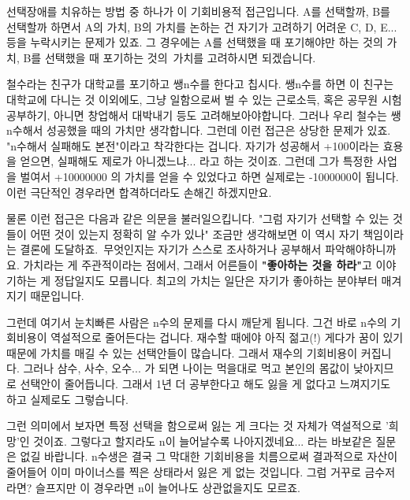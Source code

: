 선택장애를 치유하는 방법 중 하나가 이 기회비용적 접근입니다.
A를 선택할까, B를 선택할까 하면서 A의 가치, B의 가치를 논하는 건 자기가 고려하기 어려운 C, D, E... 등을 누락시키는 문제가 있죠.
그 경우에는 A를 선택했을 때 포기해야만 하는 것의 가치, B를 선택했을 때 포기하는 것의 가치를 고려하시면 되겠습니다.
\vspace{5mm}

철수라는 친구가 대학교를 포기하고 쌩n수를 한다고 칩시다.
쌩n수를 하면 이 친구는 대학교에 다니는 것 이외에도,
그냥 일함으로써 벌 수 있는 근로소득, 혹은 공무원 시험 공부하기, 아니면 창업해서 대박내기 등도 고려해보아야합니다.
그러나 우리 철수는 쌩n수해서 성공했을 때의 가치만 생각합니다.
그런데 이런 접근은 상당한 문제가 있죠. "n수해서 실패해도 본전"이라고 착각한다는 겁니다.
자기가 성공해서 +100이라는 효용을 얻으면, 실패해도 제로가 아니겠느냐... 라고 하는 것이죠.
그런데 그가 특정한 사업을 벌여서 +10000000 의 가치를 얻을 수 있었다고 하면 실제로는 -1000000이 됩니다.
이런 극단적인 경우라면 합격하더라도 손해긴 하겠지만요.
\vspace{5mm}

물론 이런 접근은 다음과 같은 의문을 불러일으킵니다.
"그럼 자기가 선택할 수 있는 것들이 어떤 것이 있는지 정확히 알 수가 있나"
조금만 생각해보면 이 역시 자기 책임이라는 결론에 도달하죠. 무엇인지는 자기가 스스로 조사하거나 공부해서 파악해야하니까요.
가치라는 게 주관적이라는 점에서, 그래서 어른들이 \textbf{"좋아하는 것을 하라"}고 이야기하는 게 정답일지도 모릅니다.
최고의 가치는 일단은 자기가 좋아하는 분야부터 매겨지기 때문입니다.
\vspace{5mm}

그런데 여기서 눈치빠른 사람은 n수의 문제를 다시 깨닫게 됩니다.
그건 바로 n수의 기회비용이 역설적으로 줄어든다는 겁니다.
재수할 때에야 아직 젊고(!) 게다가 꿈이 있기 때문에 가치를 매길 수 있는 선택안들이 많습니다.
그래서 재수의 기회비용이 커집니다.
그러나 삼수, 사수, 오수... 가 되면 나이는 먹을대로 먹고 본인의 몸값이 낮아지므로 선택안이 줄어듭니다.
그래서 1년 더 공부한다고 해도 잃을 게 없다고 느껴지기도 하고 실제로도 그렇습니다.
\vspace{5mm}

그런 의미에서 보자면 특정 선택을 함으로써 잃는 게 크다는 것 자체가 역설적으로 '희망'인 것이죠.
그렇다고 할지라도 n이 늘어날수록 나아지겠네요... 라는 바보같은 질문은 없길 바랍니다.
n수생은 결국 그 막대한 기회비용을 치름으로써 결과적으로 자산이 줄어들어 이미 마이너스를 찍은 상태라서 잃은 게 없는 것입니다.
그럼 거꾸로 금수저라면? 슬프지만 이 경우라면 n이 늘어나도 상관없을지도 모르죠.
\vspace{5mm}








